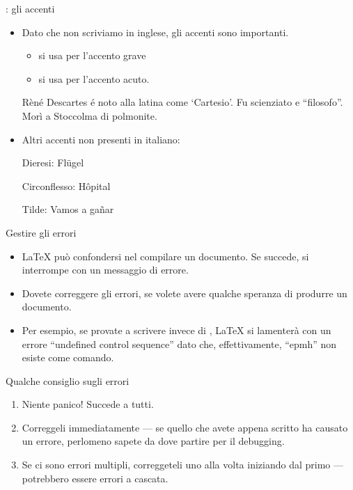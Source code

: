 \documentclass{beamer}
\begin{document}
\begin{frame}[fragile]{\insertsubsection{}: gli accenti}
\small
\begin{itemize}
\item Dato che non scriviamo in inglese, gli accenti sono importanti.
\begin{itemize}
\item {} si usa per l'accento grave
\item {} si usa per l'accento acuto.
\end{itemize}

\begin{exampletwouptiny}
R\`{e}n\'{e} Descartes \'{e} noto
alla latina come `Cartesio'.
Fu scienziato e ``filosofo''.
Mor\`{i} a Stoccolma di polmonite.
\end{exampletwouptiny}

\item Altri accenti non presenti in italiano:
\begin{exampletwouptiny}
Dieresi: Fl\"ugel

Circonflesso: H\^opital

Tilde: Vamos a ga\~nar
\end{exampletwouptiny}
\end{itemize}
\end{frame}

\begin{frame}[fragile]{Gestire gli errori}
\begin{itemize}
\item \LaTeX{} pu\`o confondersi nel compilare un documento.
Se succede, si interrompe con un messaggio di errore.
\item Dovete correggere gli errori, se volete avere qualche speranza di
produrre un documento.
\item Per esempio, se provate a scrivere  invece di ,
\LaTeX{} si lamenter\`a con un errore ``undefined control sequence'' dato che, effettivamente, ``epmh'' non esiste come comando.
\end{itemize}
\begin{block}{Qualche consiglio sugli errori}
\begin{enumerate}
\item Niente panico! Succede a tutti.
\item Correggeli immediatamente --- se quello che avete appena scritto ha causato
un errore, perlomeno sapete da dove partire per il debugging.
\item Se ci sono errori multipli, correggeteli uno alla volta iniziando dal primo 
--- potrebbero essere errori a cascata.
\end{enumerate}
\end{block}
\end{frame}
\end{document}
